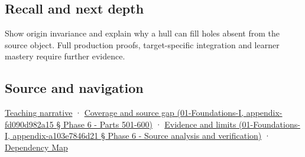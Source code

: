 \subsection{Recall and next depth}\label{recall-and-next-depth}

Show origin invariance and explain why a hull can fill holes absent from the source object. Full production proofs, target-specific integration and learner mastery require further evidence.

\subsection{Source and navigation}\label{source-and-navigation}

\href{Continuous\%20Notes/Computing\%20Foundations\%20-\%20From\%20Bits\%20to\%20C++\%20and\%20Systems\%20APIs\#Weighted\%20points\%20lead\%20from\%20affine\%20geometry\%20to\%20collision\%20shapes}{Teaching narrative} · \href{}{Coverage and source gap (01-Foundations-I, appendix-fd090d982a15 § Phase 6 - Parts 501-600)} · \href{}{Evidence and limits (01-Foundations-I, appendix-a103e7846d21 § Phase 6 - Source analysis and verification)} · \hyperref[appendix-4ad47bdd269a]{Dependency Map}
